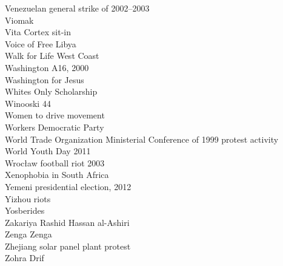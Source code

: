 Venezuelan general strike of 2002–2003\\
Viomak\\
Vita Cortex sit-in\\
Voice of Free Libya\\
Walk for Life West Coast\\
Washington A16, 2000\\
Washington for Jesus\\
Whites Only Scholarship\\
Winooski 44\\
Women to drive movement\\
Workers Democratic Party\\
World Trade Organization Ministerial Conference of 1999 protest activity\\
World Youth Day 2011\\
Wrocław football riot 2003\\
Xenophobia in South Africa\\
Yemeni presidential election, 2012\\
Yizhou riots\\
Yosberides\\
Zakariya Rashid Hassan al-Ashiri\\
Zenga Zenga\\
Zhejiang solar panel plant protest\\
Zohra Drif